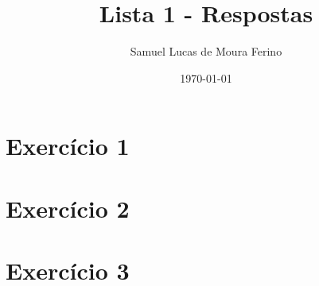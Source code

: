 \documentclass[12pt,a4paper]{article}
\title{Lista 1 - Respostas}
\author{Samuel Lucas de Moura Ferino}
\date{\today}
\begin{document}
	
	\maketitle
	
	\tableofcontents
	
	\section{Exercício 1}
	

	\section{Exercício 2}
	
	
	\section{Exercício 3}
	

	
\end{document}
